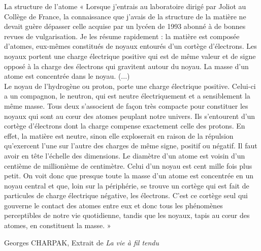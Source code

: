 \documentclass[a4paper,12pt,fleqn]{scrartcl}%
\begin{document}
	\maketitle

\noindent \begin{minipage}{\linewidth}
	\begin{documentboxenv}{La structure de l'atome}
	« Lorsque j'entrais au laboratoire dirigé par Joliot au Collège de France, la connaissance que j'avais de la structure de la matière ne devait guère dépasser celle acquise par un lycéen de 1993 abonné à de bonnes revues de vulgarisation. Je les résume rapidement : la matière est composée d'atomes, eux-mêmes constitués de noyaux entourés d'un cortège d'électrons. Les noyaux portent une charge électrique positive qui est de même valeur et de signe opposé à la charge des électrons qui gravitent autour du noyau. La masse d'un atome est concentrée dans le noyau. (...)\\
	Le noyau de l'hydrogène ou proton, porte une charge électrique positive. Celui-ci a un compagnon, le neutron, qui est neutre électriquement et a sensiblement la même masse. Tous deux s'associent de façon très compacte pour constituer les noyaux qui sont au cœur des atomes peuplant notre univers. Ils s'entourent d'un cortège d'électrons dont la charge compense exactement celle des protons. En effet, la matière est neutre, sinon elle exploserait en raison de la répulsion qu'exercent l'une sur l'autre des charges de même signe, positif ou négatif. Il faut avoir en tête l'échelle des dimensions. Le diamètre d'un atome est voisin d'un centième de millionième de centimètre. Celui d'un noyau est cent mille fois plus petit. On voit donc que presque toute la masse d'un atome est concentrée en un noyau central et que, loin sur la périphérie, se trouve un cortège qui est fait de particules de charge électrique négative, les électrons. C'est ce cortège seul qui gouverne le contact des atomes entre eux et donc tous les phénomènes perceptibles de notre vie quotidienne, tandis que les noyaux, tapis au c\oe ur des atomes, en constituent la masse. »
	\begin{flushright}
		Georges CHARPAK, Extrait de \emph{La vie à fil tendu}
	\end{flushright}
	\end{documentboxenv}
\end{minipage}
\end{document}
